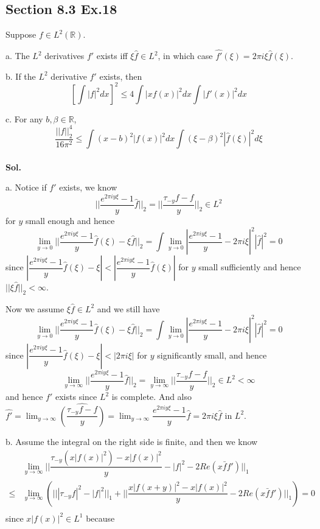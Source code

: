\documentclass[lang=en,11pt,a4paper,citestyle =authoryear]{elegantpaper}
\newcommand{\R}{\mathbb{R}}
\begin{document}
\subsection*{Section 8.3 Ex.18} 
Suppose $f\in L^2(\R)$.\par
a. The $L^2$ derivatives $f'$ exists iff $\xi\hat{f}\in L^2$, in which case $\hat{f'}(\xi) = 2\pi i \xi \hat{f}(\xi)$.\par
b. If the $L^2$ derivative $f'$ exists, then
\[
[\int |f|^2 dx]^2 \leq 4 \int |xf(x)|^2 dx \int |f'(x)|^2 dx
\]\par
c. For any $b,\beta\in\R$, 
\[\dfrac{||f||_2^4}{16\pi^2}\leq \int (x-b)^2|f(x)|^2 dx\int(\xi-\beta)^2 |\hat{f}(\xi)|^2 d\xi\]
\vspace{0.5em}\\
\textbf{Sol.} \par
a. Notice if $f'$ exists, we know
\[
||\dfrac{e^{2\pi i y\xi}-1}{y}\hat{f}||_2 = ||\dfrac{\tau_{-y}f-f}{y}||_2 \in L^2
\]
for $y$ small enough and hence
\[
\lim_{y\to 0 }||\dfrac{e^{2\pi i y\xi}-1}{y}\hat{f}(\xi) - \xi \hat{f}||_2 = \int \lim_{y\to 0}|\dfrac{e^{2\pi i y\xi}-1}{y}-2\pi i \xi|^2|\hat{f}|^2 = 0
\]
since $|\dfrac{e^{2\pi i y\xi}-1}{y}\hat{f}(\xi) - \xi|< |\dfrac{e^{2\pi i y\xi}-1}{y}\hat{f}(\xi)|$ for $y$ small sufficiently and hence $||\xi \hat{f}||_2< \infty$. \par
Now we assume $\xi \hat{f}\in L^2$ and we still have
\[
\lim_{y\to 0 }||\dfrac{e^{2\pi i y\xi}-1}{y}\hat{f}(\xi) - \xi \hat{f}||_2 = \int \lim_{y\to 0}|\dfrac{e^{2\pi i y\xi}-1}{y}-2\pi i \xi|^2|\hat{f}|^2 = 0
\]
since $|\dfrac{e^{2\pi i y\xi}-1}{y}\hat{f}(\xi) - \xi| < |2\pi i \xi|$ for $y$ significantly small, and hence
\[
\lim_{y\to \infty}||\dfrac{e^{2\pi i y\xi}-1}{y}\hat{f}||_2 = \lim_{y\to \infty}||\dfrac{\tau_{-y}f-f}{y}||_2 \in L^2 < \infty
\]
and hence $f'$ exists since $L^2$ is complete. And also $\hat{f'} = \lim_{y\to \infty} \hat{(\dfrac{\tau_{-y}f-f}{y})} = \lim_{y\to \infty} \dfrac{e^{2\pi i y\xi}-1}{y}\hat{f} = 2\pi i \xi \hat{f}$ in $L^2$.\par
b. Assume the integral on the right side is finite, and then we know
\[
\begin{aligned}
&\lim_{y\to \infty}||\dfrac{\tau_{-y}(x|f(x)|^2)-x|f(x)|^2}{y}- |f|^2 - 2Re(x\bar{f}f')||_1\\ \leq &\lim_{y\to \infty}(|||\tau_{-y}f|^2-|f|^2||_1 +||\dfrac{x|f(x+y)|^2-x|f(x)|^2}{y}-2Re(x\bar{f}f')||_1) = 0\\
\end{aligned} 
\]
since $x|f(x)|^2 \in L^1$ because
\end{document}
